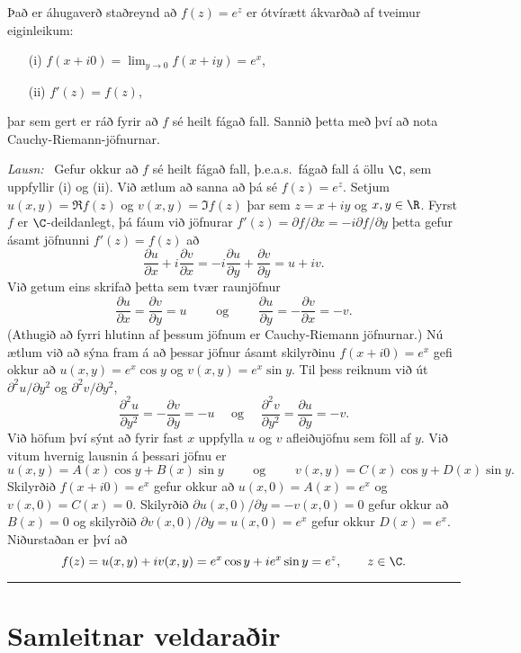 \begin{sy}
Það er áhugaverð staðreynd að $f(z)=e^z$ er ótvírætt
ákvarðað af tveimur eiginleikum: \ 
\begin{enumerate}
\item[(i)] $f(x+i0)=\lim_{y\to 0}f(x+iy)=e^x$, 
\item[(ii)] $f'(z)=f(z)$,
\end{enumerate}
þar sem gert er ráð fyrir að 
$f$ sé heilt fágað fall. Sannið þetta með því að nota
Cauchy-Riemann-jöfnurnar.

\smallskip\noindent
{\it Lausn:} \ Gefur okkur að $f$ sé heilt fágað fall, þ.e.a.s.~fágað
fall á öllu $\C$, sem uppfyllir (i) og (ii).  Við ætlum að sanna að þá
sé $f(z)=e^z$.  Setjum $u(x,y)=\Re f(z)$ og $v(x,y)=\Im f(z)$ þar sem
$z=x+iy$ og $x,y\in \R$.  Fyrst $f$ er $\C$-deildanlegt, þá fáum við jöfnurar
$f'(z)=\partial f/\partial x=-i\partial f/\partial y$ þetta gefur ásamt jöfnunni
$f'(z)=f(z)$ að
$$
\dfrac {\partial u}{\partial x}+i\dfrac {\partial v}{\partial x}=
-i\dfrac {\partial u}{\partial y}+\dfrac {\partial v}{\partial y}=u+iv.
$$ 
Við getum eins skrifað þetta sem tvær raunjöfnur
$$
\dfrac {\partial u}{\partial x}=\dfrac {\partial v}{\partial y}=u
\qquad \text{ og } \qquad \dfrac {\partial u}{\partial y}=-\dfrac
{\partial v}{\partial x}=-v.
$$
(Athugið að fyrri hlutinn af þessum jöfnum er Cauchy-Riemann
jöfnurnar.)  Nú ætlum við að sýna fram á að þessar jöfnur ásamt
skilyrðinu $f(x+i0)=e^x$ gefi okkur að $u(x,y)=e^x\cos y$ og
$v(x,y)=e^x\sin y$.  Til þess reiknum við út $\partial^2u/\partial
y^2$ og $\partial^2v/\partial y^2$,
$$
\dfrac{\partial^2u}{\partial y^2}=-\dfrac{\partial v}{\partial y}=-u
\quad \text{ og } \quad 
\dfrac{\partial^2v}{\partial y^2}=\dfrac{\partial u}{\partial y}=-v.
$$
Við höfum því sýnt að fyrir fast $x$ uppfylla $u$ og $v$ afleiðujöfnu
sem föll af $y$.  Við vitum hvernig lausnin á þessari jöfnu er
$$
u(x,y)=A(x)\cos y+ B(x)\sin y \qquad \text{ og } \qquad
v(x,y)=C(x)\cos y+D(x)\sin y.
$$
Skilyrðið $f(x+i0)=e^x$ gefur okkur að $u(x,0)=A(x)=e^x$ og
$v(x,0)=C(x)=0$.  Skilyrðið $\partial u(x,0)/\partial y=-v(x,0)=0$
gefur okkur að $B(x)=0$ og skilyrðið $\partial v(x,0)/\partial
y=u(x,0)=e^x$ gefur okkur $D(x)=e^x$.  Niðurstaðan er því að
$$
f(z)=u(x,y)+iv(x,y)=e^x\cos y+ie^x\sin y=e^z,\qquad z\in \C.
$$
\end{sy}

\bigskip\hrule\bigskip

\section{Samleitnar veldaraðir} 

